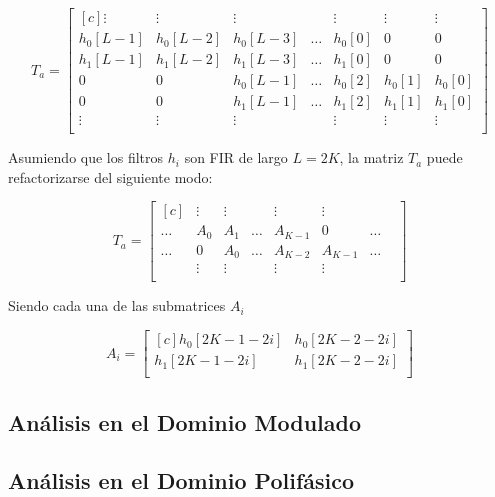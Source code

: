\begin{equation}
	T_a=
	\begin{bmatrix*}[c]
		\vdots & \vdots & \vdots & & \vdots & \vdots & \vdots\\
		h_0[L-1] & h_0[L-2] & h_0[L-3] & \hdots & h_0[0] & 0 & 0 \\
		h_1[L-1] & h_1[L-2] & h_1[L-3] & \hdots & h_1[0] & 0 & 0 \\
		0 & 0 & h_0[L-1] & \hdots & h_0[2] & h_0[1] & h_0[0] \\
		0 & 0 & h_1[L-1] & \hdots & h_1[2] & h_1[1] & h_1[0] \\
		\vdots & \vdots & \vdots & & \vdots & \vdots & \vdots \\
	\end{bmatrix*}
\end{equation}

Asumiendo que los filtros $h_i$ son FIR de largo $L=2K$, la matriz $T_a$ puede refactorizarse del siguiente modo:

\begin{equation}
	T_a=
	\begin{bmatrix*}[c]
		 & \vdots & \vdots &  & \vdots & \vdots & &\\
		\hdots & A_0 & A_1 & \hdots & A_{K-1} & 0 & \hdots  \\
		\hdots & 0 & A_0 & \hdots & A_{K-2} & A_{K-1} & \hdots  \\
		 & \vdots & \vdots &  & \vdots & \vdots & &\\		
	\end{bmatrix*}
\end{equation}

Siendo cada una de las submatrices $A_i$

\begin{equation}
	A_i=
	\begin{bmatrix*}[c]
		h_0[2K-1-2i] & h_0[2K-2-2i] \\
		h_1[2K-1-2i] & h_1[2K-2-2i] \\
	\end{bmatrix*}
\end{equation}

\subsection{Análisis en el Dominio Modulado}


\subsection{Análisis en el Dominio Polifásico}

